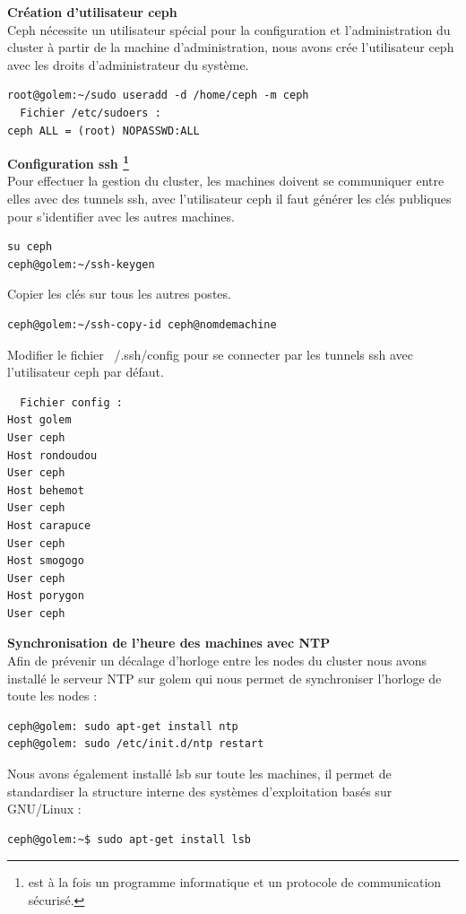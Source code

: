 \documentclass[12pt]{article}
\begin{document}
\textbf{ Création d'utilisateur ceph}
\\Ceph nécessite un utilisateur spécial pour la configuration et l'administration du cluster à partir de la machine d'administration, nous avons crée l'utilisateur ceph avec les droits d'administrateur du système.
\begin{verbatim}
root@golem:~/sudo useradd -d /home/ceph -m ceph
  Fichier /etc/sudoers :
ceph ALL = (root) NOPASSWD:ALL
\end{verbatim}

\textbf{Configuration ssh \footnote{est à la fois un programme informatique et un protocole de communication sécurisé.}}
\\Pour effectuer la gestion du cluster, les machines doivent se communiquer entre elles avec des tunnels ssh, avec l'utilisateur ceph il faut générer les clés publiques pour s'identifier avec les autres machines.
\begin{verbatim}
su ceph
ceph@golem:~/ssh-keygen
\end{verbatim}

Copier les clés sur tous les autres postes.
\begin{verbatim}
ceph@golem:~/ssh-copy-id ceph@nomdemachine
\end{verbatim}

Modifier le fichier ~/.ssh/config pour se connecter par les tunnels ssh avec l'utilisateur ceph par défaut.
\begin{verbatim}
  Fichier config :
Host golem
User ceph
Host rondoudou
User ceph
Host behemot
User ceph
Host carapuce
User ceph
Host smogogo
User ceph
Host porygon
User ceph
\end{verbatim}

\textbf{Synchronisation de l'heure des machines avec NTP }
\\Afin de prévenir un décalage d'horloge entre les nodes du cluster nous avons installé le serveur NTP sur golem qui nous permet de synchroniser l'horloge de toute les nodes :
\begin{verbatim}
ceph@golem: sudo apt-get install ntp
ceph@golem: sudo /etc/init.d/ntp restart
\end{verbatim}

Nous avons également installé lsb sur toute les machines, il permet de standardiser la structure interne des systèmes d'exploitation basés sur GNU/Linux :
\begin{verbatim}
ceph@golem:~$ sudo apt-get install lsb
\end{verbatim}
\end{document}
